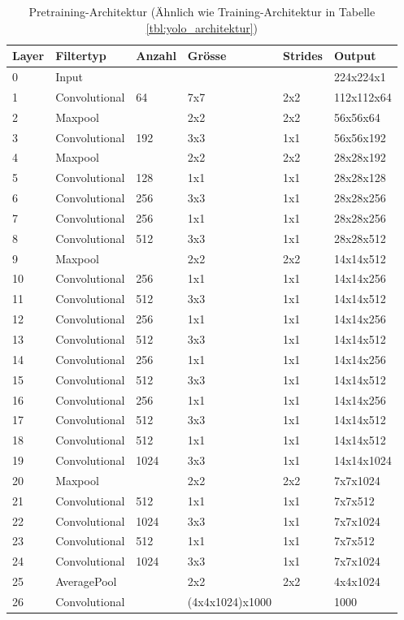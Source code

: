 \begin{table}
\centering
\begin{tabularx}{1.1\textwidth}{|l|l|l|l|l|X|}
\hline
\textbf{Layer} & \textbf{Filtertyp}  & \textbf{Anzahl} & \textbf{Grösse} & \textbf{Strides} & \textbf{Output} \\
\hline 	0	& Input				&		&		&		& 224x224x1\\
\hline 	1	& Convolutional		& 64		& 7x7	& 2x2	& 112x112x64	\\
\hline 	2	& Maxpool      		& 		& 2x2	& 2x2	& 56x56x64	\\
\hline 	3   & Convolutional		& 192	& 3x3	& 1x1	& 56x56x192\\
\hline 	4	& Maxpool			& 		& 2x2	& 2x2	& 28x28x192	\\
\hline 	5	& Convolutional		& 128	& 1x1	& 1x1	& 28x28x128	\\
\hline 	6	& Convolutional		& 256	& 3x3	& 1x1	& 28x28x256	\\
\hline 	7	& Convolutional		& 256	& 1x1	& 1x1	& 28x28x256	\\
\hline 	8	& Convolutional		& 512	& 3x3	& 1x1	& 28x28x512	\\
\hline 	9	& Maxpool			&		& 2x2	& 2x2	& 14x14x512	\\
\hline 	10	& Convolutional		& 256	& 1x1	& 1x1	& 14x14x256	\\
\hline 	11	& Convolutional		& 512	& 3x3	& 1x1	& 14x14x512	\\
\hline 	12	& Convolutional		& 256	& 1x1	& 1x1	& 14x14x256	\\
\hline 	13	& Convolutional		& 512	& 3x3	& 1x1	& 14x14x512	\\
\hline 	14	& Convolutional		& 256	& 1x1	& 1x1	& 14x14x256	\\
\hline 	15	& Convolutional		& 512	& 3x3	& 1x1	& 14x14x512	\\
\hline  	16	& Convolutional		& 256	& 1x1	& 1x1	& 14x14x256	\\
\hline  	17	& Convolutional		& 512	& 3x3	& 1x1	& 14x14x512	\\
\hline 	18	& Convolutional		& 512	& 1x1	& 1x1	& 14x14x512	\\
\hline  	19	& Convolutional		& 1024	& 3x3	& 1x1	& 14x14x1024	\\
\hline  	20	& Maxpool			&		& 2x2	& 2x2	& 7x7x1024	\\
\hline  	21	& Convolutional		& 512	& 1x1	& 1x1	& 7x7x512	\\
\hline  	22	& Convolutional		& 1024	& 3x3	& 1x1	& 7x7x1024	\\
\hline  	23	& Convolutional		& 512	& 1x1	& 1x1	& 7x7x512	\\
\hline  	24	& Convolutional		& 1024	& 3x3	& 1x1	& 7x7x1024	\\
\hline  	25	& AveragePool		&  		& 2x2	& 2x2	& 4x4x1024	\\
\hline  	26	& Convolutional		&     	& (4x4x1024)x1000	& 	& 1000	\\
\hline 	
\end{tabularx}
\caption{Pretraining-Architektur (Ähnlich wie Training-Architektur in Tabelle \ref{tbl:yolo_architektur})}
\label{tbl:pretraining_Architektur}
\end{table}
 
